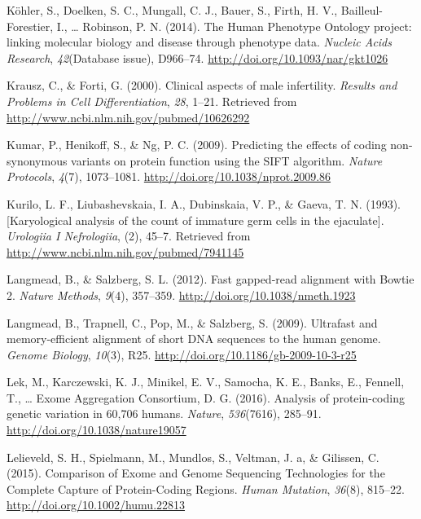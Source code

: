 \documentclass[12pt,twoside]{reedthesis}
\theoremstyle{definition}
\theoremstyle{definition}
\theoremstyle{remark}
\begin{document}
  \hypertarget{ref-Kohler2014}{}
  Köhler, S., Doelken, S. C., Mungall, C. J., Bauer, S., Firth, H. V.,
  Bailleul-Forestier, I., \ldots{} Robinson, P. N. (2014). The Human
  Phenotype Ontology project: linking molecular biology and disease
  through phenotype data. \emph{Nucleic Acids Research},
  \emph{42}(Database issue), D966--74.
  \url{http://doi.org/10.1093/nar/gkt1026}
  
  \hypertarget{ref-Krausz2000}{}
  Krausz, C., \& Forti, G. (2000). Clinical aspects of male infertility.
  \emph{Results and Problems in Cell Differentiation}, \emph{28}, 1--21.
  Retrieved from \url{http://www.ncbi.nlm.nih.gov/pubmed/10626292}
  
  \hypertarget{ref-Kumar2009}{}
  Kumar, P., Henikoff, S., \& Ng, P. C. (2009). Predicting the effects of
  coding non-synonymous variants on protein function using the SIFT
  algorithm. \emph{Nature Protocols}, \emph{4}(7), 1073--1081.
  \url{http://doi.org/10.1038/nprot.2009.86}
  
  \hypertarget{ref-Kurilo}{}
  Kurilo, L. F., Liubashevskaia, I. A., Dubinskaia, V. P., \& Gaeva, T. N.
  (1993). {[}Karyological analysis of the count of immature germ cells in
  the ejaculate{]}. \emph{Urologiia I Nefrologiia}, (2), 45--7. Retrieved
  from \url{http://www.ncbi.nlm.nih.gov/pubmed/7941145}
  
  \hypertarget{ref-Langmead2012}{}
  Langmead, B., \& Salzberg, S. L. (2012). Fast gapped-read alignment with
  Bowtie 2. \emph{Nature Methods}, \emph{9}(4), 357--359.
  \url{http://doi.org/10.1038/nmeth.1923}
  
  \hypertarget{ref-Langmead2009}{}
  Langmead, B., Trapnell, C., Pop, M., \& Salzberg, S. (2009). Ultrafast
  and memory-efficient alignment of short DNA sequences to the human
  genome. \emph{Genome Biology}, \emph{10}(3), R25.
  \url{http://doi.org/10.1186/gb-2009-10-3-r25}
  
  \hypertarget{ref-Lek2016}{}
  Lek, M., Karczewski, K. J., Minikel, E. V., Samocha, K. E., Banks, E.,
  Fennell, T., \ldots{} Exome Aggregation Consortium, D. G. (2016).
  Analysis of protein-coding genetic variation in 60,706 humans.
  \emph{Nature}, \emph{536}(7616), 285--91.
  \url{http://doi.org/10.1038/nature19057}
  
  \hypertarget{ref-Lelieveld2015}{}
  Lelieveld, S. H., Spielmann, M., Mundlos, S., Veltman, J. a, \&
  Gilissen, C. (2015). Comparison of Exome and Genome Sequencing
  Technologies for the Complete Capture of Protein-Coding Regions.
  \emph{Human Mutation}, \emph{36}(8), 815--22.
  \url{http://doi.org/10.1002/humu.22813}
  
\end{document}
